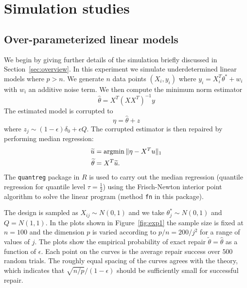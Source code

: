 
\section{Simulation studies}
\label{sec:experiments}
\let\beta\theta

\subsection{Over-parameterized linear models}


We begin by giving further details of the simulation briefly discussed
in Section~\ref{sec:overview}. In this experiment we simulate underdetermined linear models where $p > n$.
We generate $n$ data points $(X_i, y_i)$ where
$y_i = X_i^T \beta^* + w_i$ with $w_i$ an additive noise term. We then compute the minimum norm estimator
\begin{equation}
  \hat\beta = X^T (X X^T)^{-1} y
\end{equation}
The estimated model is corrupted to
\begin{equation}
  \eta = \hat\beta + z
\end{equation}
where $z_j \sim (1-\epsilon) \delta_0 +\epsilon Q$. The corrupted estimator is then repaired by performing median regression:
\begin{align}
  \tilde u &= \argmin \|\eta - X^T u\|_1 \\
  \tilde \beta &= X^T \tilde u.
\end{align}
The \texttt{quantreg} package in $R$ is used to carry out the median regression (quantile regression for quantile level $\tau = \frac{1}{2}$) using the Frisch-Newton interior point algorithm to solve the linear program (method \texttt{fn} in this package).

The design is sampled as $X_{ij} \sim N(0,1)$ and we take $\beta_j^* \sim N(0,1)$ and $Q = N(1,1)$. In the plots shown
in Figure~\ref{fig:exp1} the sample size is fixed at $n=100$ and the dimension $p$ is varied according to $p/n=200/j^2$
for a range of values of $j$. The plots show the empirical probability of exact repair $\tilde\beta = \hat\beta$ as a function of $\epsilon$. Each point on the curves is the average repair success over $500$ random trials.
The roughly equal spacing of the curves agrees with the theory, which indicates that $\sqrt{n/p}/(1-\epsilon)$ should be sufficiently small for successful repair.

